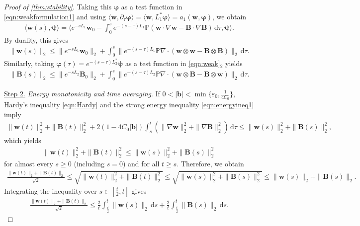 \documentclass[10pt]{amsart}
\theoremstyle{plain}
\theoremstyle{definition}
\theoremstyle{remark}
\numberwithin{equation}{section}
\newcommand{\bb}{{\boldsymbol{b}}}
\newcommand{\bw}{{\boldsymbol{w}}}
\newcommand{\bB}{{\boldsymbol{B}}}
\newcommand{\vp}{\varphi}
\newcommand{\ve}{\varepsilon}
\begin{document}
\begin{proof}[Proof of \cref{thm:stability}]
Taking this $\boldsymbol{\vp}$ as a test function in \eqref{eqn:weakformulation1} and using $\langle\bw,\partial_\tau\boldsymbol{\vp}\rangle=\langle\bw,L_1^*\boldsymbol{\vp}\rangle=a_1(\bw,\boldsymbol{\vp})$, we obtain
\begin{align*}
\langle \bw(s), \boldsymbol{\psi} \rangle
= \Big\langle e^{-sL_1}\bw_0
- \int_0^s e^{-(s-\tau)L_1}\mathbb{P}(\bw\cdot\nabla\bw-\bB\cdot\nabla\bB)\, \mathrm d\tau, \boldsymbol{\psi} \Big\rangle.
\end{align*}
By duality, this gives
\begin{align}\label{eqn:estimate2-1}
\|\bw(s)\|_2 \leq \|e^{-sL_1} \bw_0\|_2 + \int_0^s \bigl\|e^{-(s-\tau)L_1} \mathbb{P} \nabla\cdot (\bw \otimes \bw - \bB \otimes \bB)\bigr\|_2 \, \mathrm{d}\tau.
\end{align}
Similarly, taking $\boldsymbol{\vp}(\tau)=e^{-(s-\tau)L_2^*}\boldsymbol{\psi}$ as a test function in \cref{eqn:weak}$_2$ yields
\begin{align}\label{eqn:estimate2-2}
\|\bB(s)\|_2 \leq \|e^{-sL_2} \bB_0\|_2 + \int_0^s \bigl\|e^{-(s-\tau)L_2} \mathbb{P} \nabla\cdot (\bw \otimes \bB - \bB \otimes \bw)\bigr\|_2 \, \mathrm{d}\tau.
\end{align}



\uline{Step 2.} \emph{Energy monotonicity and time averaging}. If $0<|\bb|<\min\{\ve_0,\frac{1}{4C_0}\}$, Hardy's inequality \cref{eqn:Hardy} and the strong energy inequality \cref{eqn:energyineq1} imply
\begin{align}\label{eqn:energyineq2}
\|\bw(t)\|_2^2 + \|\bB(t)\|_2^2 + 2(1-4C_0|\bb|) \int_s^t \left(\|\nabla \bw\|_2^2 + \|\nabla \bB\|_2^2\right) \, \mathrm d\tau \leq \|\bw(s)\|_2^2 + \|\bB(s)\|_2^2,
\end{align}
which yields
\begin{align}\label{eq:s-est-0}
\|\bw(t)\|_2^2 + \|\bB(t)\|_2^2 \leq \|\bw(s)\|_2^2 + \|\bB(s)\|_2^2
\end{align}
for almost every $s\geq 0$ (including $s=0$) and for all $t\geq s$.
Therefore, we obtain
\begin{align*}
\frac{\|\bw(t)\|_2 + \|\bB(t)\|_2}{\sqrt{2}} 
\leq \sqrt{\|\bw(t)\|_2^2 + \|\bB(t)\|_2^2} 
\leq \sqrt{\|\bw(s)\|_2^2 + \|\bB(s)\|_2^2} 
\leq \|\bw(s)\|_2 + \|\bB(s)\|_2.
\end{align*}
Integrating the inequality over $s\in[\frac{t}{2}, t]$ gives
\begin{align}\label{eqn:estimate1}
\frac{\|\bw(t)\|_2 + \|\bB(t)\|_2}{\sqrt{2}} 
\leq \frac{2}{t} \int_{\frac{t}{2}}^{t} \|\bw(s)\|_2 \, \mathrm ds + \frac{2}{t} \int_{\frac{t}{2}}^{t} \|\bB(s)\|_2 \, \mathrm ds. 
\end{align}


\end{proof}
\end{document}
